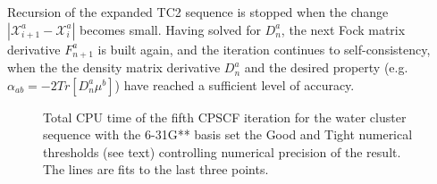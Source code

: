 \documentclass[prl,aps,twocolumn,showpacs,twocolumngrid,superbib]{revtex4}
\begin{document}
Recursion of the expanded TC2 sequence is stopped when the change 
$\left| \mathcal{X}^a_{i+1}-\mathcal{X}^a_i \right|$ becomes small.  Having solved for $D^a_n$, 
the next Fock matrix derivative $F^a_{n+1}$ is built again, 
and the iteration continues to self-consistency, when the the density matrix derivative
$D^a_n$ and the desired property (e.g. $\alpha_{ab}=-2Tr[D^a_n\mu^b]$) have reached a sufficient 
level of accuracy.

\begin{figure}[t]
\label{fig:Alpha_h2o3D_6-31Gss_G_T_t}
\caption{\protect  Total CPU time of the fifth CPSCF iteration for the water cluster sequence with 
         the 6-31G** basis set the Good and Tight numerical thresholds (see text) 
         controlling numerical precision of the result.  The lines are fits to the last three points.}
\end{figure}
\end{document}
